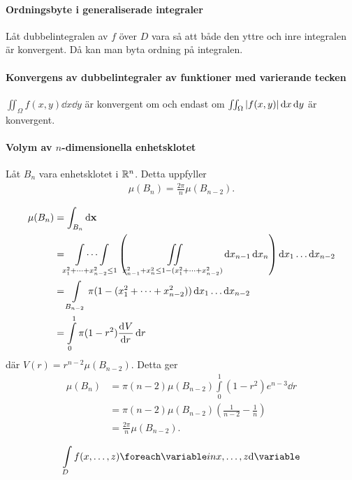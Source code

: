 \proof

\paragraph{Ordningsbyte i generaliserade integraler}
Låt dubbelintegralen av $f$ över $D$ vara så att både den yttre och inre integralen är konvergent. Då kan man byta ordning på integralen.

\proof

\paragraph{Konvergens av dubbelintegraler av funktioner med varierande tecken}
$\iint_{\Omega}f(x, y)\dd{x}\dd{y}$ är konvergent om och endast om $\iint_{\Omega}\abs{f(x, y)}\dd{x}\dd{y}$ är konvergent.

\proof

\paragraph{Volym av $n$-dimensionella enhetsklotet}
Låt $B_n$ vara enhetsklotet i $\mathbb{R}^n$. Detta uppfyller
\begin{align*}
	\mu (B_n) = \frac{2\pi}{n}\mu (B_{n - 2}).
\end{align*}

\proof
\begin{align*}
	\mu (B_n) &= \int_{B_n}\dd{\vect{x}} \\
	          &= \idotsint\limits_{x_1^2 + \dots + x_{n -2}^2\leq 1}\left(\iint\limits_{x_{n - 1}^2 + x_n^2\leq 1 - (x_1^2 + \dots + x_{n -2}^2)}\dd{x_{n -1}}\dd{x_n}\right)\dd{x_1}\dots\dd{x_{n - 2}} \\
	          &= \int\limits_{B_{n - 2}}\pi(1 - (x_1^2 + \dots + x_{n -2}^2))\dd{x_1}\dots\dd{x_{n - 2}} \\
	          &= \int\limits_{0}^{1}\pi (1 - r^2)\deval{V}{r}{r}\dd{r}
\end{align*}
där $V(r) = r^{n - 2}\mu (B_{n - 2})$. Detta ger
\begin{align*}
	\mu (B_n) &= \pi (n - 2)\mu (B_{n - 2})\int\limits_{0}^{1}(1 - r^2)e^{n - 3}\dd{r} \\
	          &= \pi (n - 2)\mu (B_{n - 2})\left(\frac{1}{n - 2} - \frac{1}{n}\right) \\
	          &= \frac{2\pi}{n}\mu (B_{n - 2}).
\end{align*}

\begin{align*}
	\inteval{D}{f}{{x, \dots ,z}}
\end{align*}